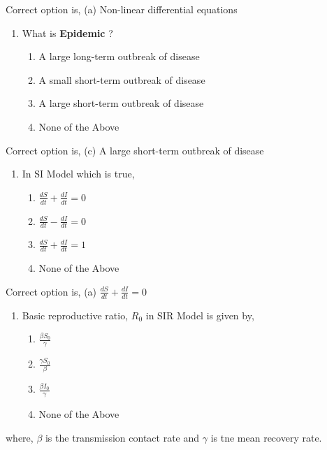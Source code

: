 \documentclass[12pt,a4paper]{article}
\begin{document}
    Correct option is, (a) Non-linear differential equations

    \vspace*{0.5cm}

    \begin{enumerate}[label=11.]
        \item What is {\bf Epidemic} ?
        \begin{enumerate}
            \item A large long-term outbreak of disease
            \item A small short-term outbreak of disease
            \item A large short-term outbreak of disease
            \item None of the Above
        \end{enumerate}
    \end{enumerate}

    Correct option is, (c) A large short-term outbreak of disease
    \vspace*{0.5cm}

    \begin{enumerate}[label=12.]
        \item In SI Model which is true, 
        \begin{enumerate}
            \item $\frac{dS}{dt}+\frac{dI}{dt}=0$
            \item $\frac{dS}{dt}-\frac{dI}{dt}=0$
            \item $\frac{dS}{dt}+\frac{dI}{dt}=1$
            \item None of the Above
        \end{enumerate}
    \end{enumerate}

    Correct option is, (a) $\frac{dS}{dt}+\frac{dI}{dt}=0$

    \pagebreak

    \vspace*{0.5cm}

    \begin{enumerate}[label=13.]
        \item Basic reproductive ratio, $R_0$ in SIR Model is given by, 
        \begin{enumerate}
            \item $\frac{\beta S_0}{\gamma}$
            \item $\frac{\gamma S_0}{\beta}$
            \item $\frac{\beta I_0}{\gamma}$
            \item None of the Above
        \end{enumerate}
    \end{enumerate}
    where, $\beta$ is the transmission contact rate and $\gamma$ is tne mean recovery rate.
\end{document}
